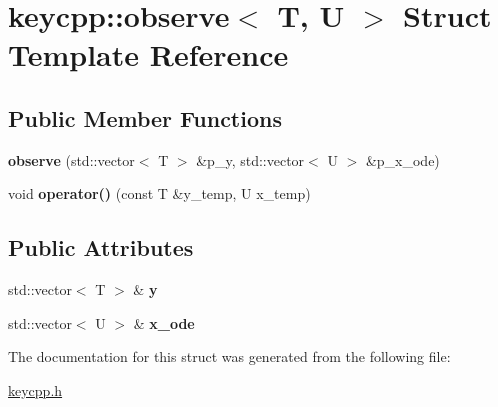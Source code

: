 \hypertarget{structkeycpp_1_1observe}{\section{keycpp\-:\-:observe$<$ T, U $>$ Struct Template Reference}
\label{structkeycpp_1_1observe}
}
\subsection*{Public Member Functions}
\begin{DoxyCompactItemize}
\item 
\hypertarget{structkeycpp_1_1observe_a88747e0078d06440401d309aba55954e}{{\bfseries observe} (std\-::vector$<$ T $>$ \&p\-\_\-y, std\-::vector$<$ U $>$ \&p\-\_\-x\-\_\-ode)}\label{structkeycpp_1_1observe_a88747e0078d06440401d309aba55954e}

\item 
\hypertarget{structkeycpp_1_1observe_a0063ab6fcada5756c6dca31ac7c17af9}{void {\bfseries operator()} (const T \&y\-\_\-temp, U x\-\_\-temp)}\label{structkeycpp_1_1observe_a0063ab6fcada5756c6dca31ac7c17af9}

\end{DoxyCompactItemize}
\subsection*{Public Attributes}
\begin{DoxyCompactItemize}
\item 
\hypertarget{structkeycpp_1_1observe_ab864306595f62009949934d352b43abf}{std\-::vector$<$ T $>$ \& {\bfseries y}}\label{structkeycpp_1_1observe_ab864306595f62009949934d352b43abf}

\item 
\hypertarget{structkeycpp_1_1observe_aecc1e14f64f33f35c50aee35cc86dac5}{std\-::vector$<$ U $>$ \& {\bfseries x\-\_\-ode}}\label{structkeycpp_1_1observe_aecc1e14f64f33f35c50aee35cc86dac5}

\end{DoxyCompactItemize}


The documentation for this struct was generated from the following file\-:\begin{DoxyCompactItemize}
\item 
\hyperlink{keycpp_8h}{keycpp.\-h}\end{DoxyCompactItemize}
